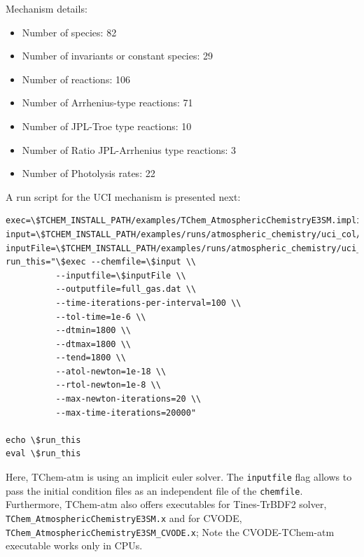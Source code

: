 \documentclass[report, 12pt]{SANDreport}
\begin{document}
Mechanism details:

\begin{itemize}
    \item Number of species: 82
    \item Number of invariants or constant species: 29
    \item Number of reactions: 106
    \item Number of Arrhenius-type reactions: 71
    \item Number of JPL-Troe type reactions: 10
    \item Number of Ratio JPL-Arrhenius type reactions: 3
    \item Number of Photolysis rates: 22
\end{itemize}


A run script for the UCI mechanism is presented next:

\begin{Verbatim}
exec=\$TCHEM_INSTALL_PATH/examples/TChem_AtmosphericChemistryE3SM.implicit_euler.x
input=\$TCHEM_INSTALL_PATH/examples/runs/atmospheric_chemistry/uci_col/uci_v2_test3.yaml
inputFile=\$TCHEM_INSTALL_PATH/examples/runs/atmospheric_chemistry/uci_col/input_conditions_multi_col.yaml
run_this="\$exec --chemfile=\$input \\
          --inputfile=\$inputFile \\
          --outputfile=full_gas.dat \\
          --time-iterations-per-interval=100 \\
          --tol-time=1e-6 \\
          --dtmin=1800 \\
          --dtmax=1800 \\
          --tend=1800 \\
          --atol-newton=1e-18 \\
          --rtol-newton=1e-8 \\
          --max-newton-iterations=20 \\
          --max-time-iterations=20000"

echo \$run_this
eval \$run_this
\end{Verbatim}


Here, TChem-atm is using an implicit euler solver. The \verb|inputfile| flag allows to pass the initial condition files as an independent file of the \verb|chemfile|. Furthermore, TChem-atm also offers executables for Tines-TrBDF2 solver, \verb|TChem_AtmosphericChemistryE3SM.x| and for CVODE, \verb|TChem_AtmosphericChemistryE3SM_CVODE.x|; Note the CVODE-TChem-atm executable works only in CPUs.
\end{document}

